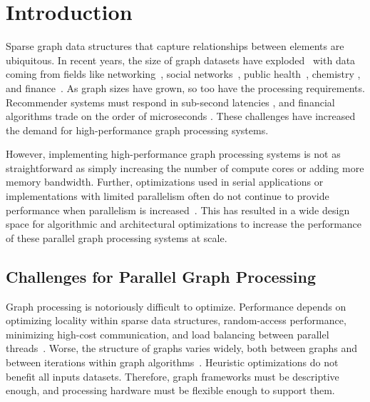 \chapter{Introduction}\label{gen:sec:intro}



Sparse graph data structures that capture relationships between elements are ubiquitous.
In recent years, the size of graph datasets have exploded~\cite{sahu2017ubiquity} with data coming from fields like networking~\cite{lehmberg2014structure}, social networks~\cite{sharma2016graphjet, eksombatchai2018pixie}, public health~\cite{keeling2005networks, Ulyantsev2016Metafast}, chemistry \cite{tsubaki2019compound}, and finance~\cite{boginski2005finance}. 
As graph sizes have grown, so too have the processing requirements. Recommender systems must respond in sub-second latencies \cite{sharma2016graphjet, eksombatchai2018pixie}, and financial algorithms trade on the order of microseconds \cite{menkveld2018hft}.
These challenges have increased the demand for high-performance graph processing systems.

However, implementing high-performance graph processing systems is not as straightforward as simply increasing the number of compute cores or adding more memory bandwidth. 
Further, optimizations used in serial applications or implementations with limited parallelism often do not continue to provide performance when parallelism is increased~\cite{beamer2015locality}.
This has resulted in a wide design space for algorithmic and architectural optimizations to increase the performance of these parallel graph processing systems at scale.


\section{Challenges for Parallel Graph Processing}

Graph processing is notoriously difficult to optimize. 
Performance depends on optimizing locality within sparse data structures, random-access performance, minimizing high-cost communication, and load balancing between parallel threads~\cite{lumsdaine2007challenges, beamer2015locality}. 
Worse, the structure of graphs varies widely, both between graphs and between iterations within graph algorithms~\citep{lumsdaine2007challenges, beamer-bfs-direction}. Heuristic optimizations do not benefit all inputs datasets. 
Therefore, graph frameworks must be descriptive enough, and processing hardware must be flexible enough to support them.


